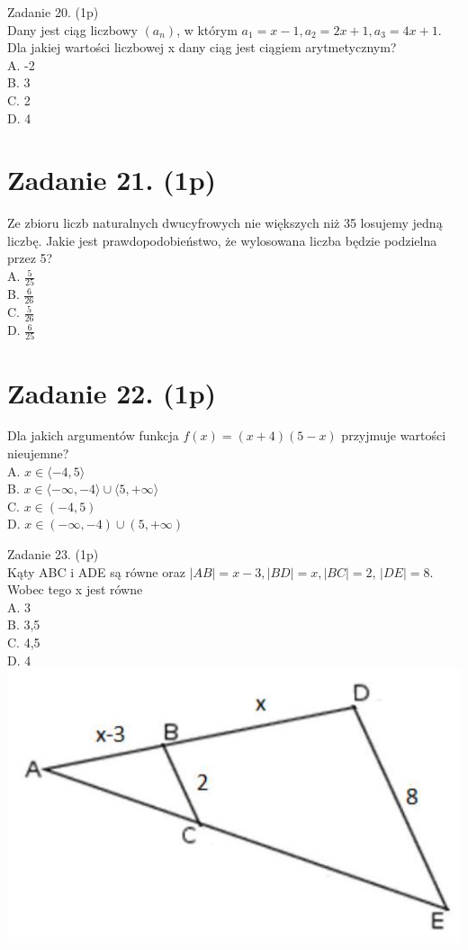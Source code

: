 \documentclass[10pt]{article}
\begin{document}
Zadanie 20. (1p)\\
Dany jest ciąg liczbowy \(\left(a_{n}\right)\), w którym \(a_{1}=x-1, a_{2}=2 x+1, a_{3}=4 x+1\). Dla jakiej wartości liczbowej x dany ciąg jest ciągiem arytmetycznym?\\
A. -2\\
B. 3\\
C. 2\\
D. 4

\section*{Zadanie 21. (1p)}
Ze zbioru liczb naturalnych dwucyfrowych nie większych niż 35 losujemy jedną liczbę. Jakie jest prawdopodobieństwo, że wylosowana liczba będzie podzielna przez 5?\\
A. \(\frac{5}{25}\)\\
B. \(\frac{6}{26}\)\\
C. \(\frac{5}{26}\)\\
D. \(\frac{6}{25}\)

\section*{Zadanie 22. (1p)}
Dla jakich argumentów funkcja \(f(x)=(x+4)(5-x)\) przyjmuje wartości nieujemne?\\
A. \(x \in\langle-4,5\rangle\)\\
B. \(x \in\langle-\infty,-4\rangle \cup\langle 5,+\infty\rangle\)\\
C. \(x \in(-4,5)\)\\
D. \(x \in(-\infty,-4) \cup(5,+\infty)\)

Zadanie 23. (1p)\\
Kąty ABC i ADE są równe oraz \(|A B|=x-3,|B D|=x,|B C|=2\), \(|D E|=8\). Wobec tego x jest równe\\
A. 3\\
B. 3,5\\
C. 4,5\\
D. 4\\
\includegraphics[max width=\textwidth, center]{2024_11_21_0213a2175f3206eefc55g-06(1)}
\end{document}
